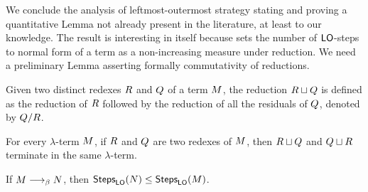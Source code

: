 We conclude the analysis of leftmost-outermost strategy stating and proving a quantitative Lemma not already present in the literature, at least to our knowledge. The result is interesting in itself because sets the number of $\textsf{LO}$-steps to normal form of a term as a non-increasing measure under reduction. We need a preliminary Lemma asserting formally commutativity of reductions.
\begin{LONG}
	\begin{notation}
		Given two distinct redexes $R$ and $Q$ of a term $M$, the reduction $R\sqcup Q$ is defined as the reduction of $R$ followed by the reduction of all the residuals of $Q$, denoted by $Q/R$.
	\end{notation}
	\begin{lemma}\label{lemma:parallel}
		For every $\lambda$-term $M$, if $R$ and $Q$ are two redexes of $M$, then $R\sqcup Q$ and $Q\sqcup R$ terminate in the same $\lambda$-term.
	\end{lemma}
\end{LONG}
\begin{lemma}\label{lemma:derivationlength}
	If $M\longrightarrow_\beta N$, then $\textsf{Steps}_{\textsf{LO}}(N) \leq \textsf{Steps}_{\textsf{LO}}(M)$.
\end{lemma}
